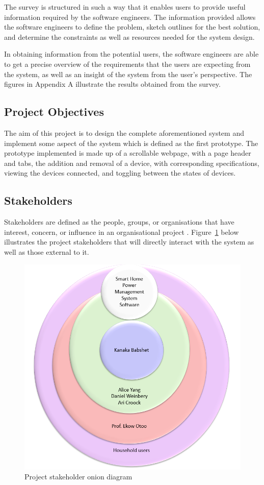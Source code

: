 \documentclass[10pt,twocolumn]{witseiepaper}
\begin{document}
	The survey is structured in such a way that it enables users to provide useful information required by the software engineers. The information provided allows the software engineers to define the problem, sketch outlines for the best solution, and determine the constraints as well as resources needed for the system design.
	
	In obtaining information from the potential users, the software engineers are able to get a precise overview of the requirements that the users are expecting from the system, as well as an insight of the system from the user's perspective. 
	\newpage
	The figures in Appendix A illustrate the results obtained from the survey.
	
	\subsection{Project Objectives}
	
	The aim of this project is to design the complete aforementioned system and implement some aspect of the system which is defined as the first prototype. The prototype implemented is made up of a scrollable webpage, with a page header and tabs, the addition and removal of a device, with corresponding specifications, viewing the devices connected, and toggling between the states of devices. 
	
	\subsection{Stakeholders}
	
	Stakeholders are defined as the people, groups, or organisations that have interest, concern, or influence in an organisational project \cite{stakeholders}. Figure~\ref{fig:stakeholders} below illustrates the project stakeholders that will directly interact with the system as well as those external to it. 
	
	\begin{figure}[H]
		\centering
		\includegraphics[width=0.75\linewidth]{stakeholders}
		\caption{Project stakeholder onion diagram}
		\label{fig:stakeholders}
	\end{figure}
\end{document}
